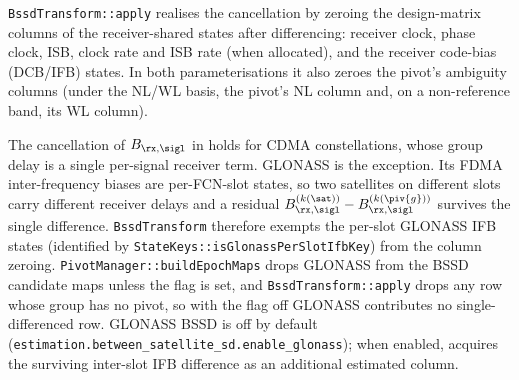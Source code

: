 \texttt{BssdTransform::apply} realises the cancellation by zeroing the design-matrix columns
of the receiver-shared states after differencing: receiver clock, phase clock, ISB,
clock rate and ISB rate (when allocated), and the receiver code-bias (DCB/IFB) states.
In both parameterisations it also zeroes the pivot's ambiguity columns (under the
NL/WL basis, the pivot's NL column and, on a non-reference band, its WL column).

The cancellation of $B_{\rx,\sigl}$ in  holds for CDMA
constellations, whose group delay is a single per-signal receiver term.  GLONASS is
the exception.  Its FDMA inter-frequency biases are per-FCN-slot states, so two
satellites on different slots carry different receiver delays and a residual
$B^{(k(\sat))}_{\rx,\sigl} - B^{(k(\piv{g}))}_{\rx,\sigl}$ survives the single
difference.  \texttt{BssdTransform} therefore exempts the per-slot GLONASS IFB states
(identified by \texttt{StateKeys::isGlonassPerSlotIfbKey}) from the column zeroing.
\texttt{PivotManager::buildEpochMaps} drops GLONASS from the BSSD candidate maps
unless the flag is set, and \texttt{BssdTransform::apply} drops any row whose group
has no pivot, so with the flag off GLONASS contributes no single-differenced row.
GLONASS BSSD is off by default
(\texttt{estimation.between\_satellite\_sd.enable\_glonass}); when enabled,
 acquires the surviving inter-slot IFB difference as an
additional estimated column.

